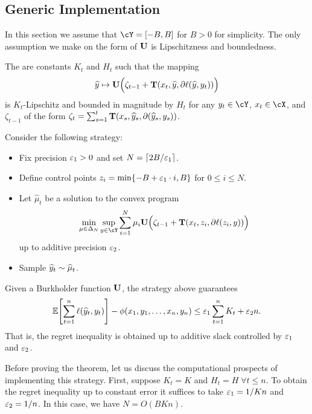 
\subsection{Generic Implementation}
In this section we assume that $\cY=\brk*{-B, B}$ for $B>0$ for simplicity. The only assumption we make on the form of $\burk$ is Lipschitzness and boundedness.

\begin{assumption}
The are constants $K_t$ and $H_t$ such that the mapping
\[
\yh\mapsto{}\burk\Big(\zeta_{t-1} + \suff(x_t,\pred,\partial \loss(\pred,y_t))\Big)
\]
is $K_t$-Lipschitz and bounded in magnitude by $H_t$ for any $y_t\in\cY$, $x_t\in\cX$, and $\zeta_{t-1}$ of the form $\zeta_{t}=\sum_{s=1}^{t}\suff(x_s, \pred_s, \partial(\pred_s, y_s))$.
\end{assumption}

Consider the following strategy:
\begin{itemize}
\item Fix precision $\veps_{1}>0$ and set $N=\ceil*{2B/\veps_{1}}$.
\item Define control points $z_{i} = \min\crl*{-B + \veps_{1}\cdot{}i, B}$ for $0\leq{}i\leq{}N$.
\item Let $\widehat{\mu}_{t}$ be a solution to the convex program
\begin{equation}
\label{eq:burkholder_approx}
\min_{\mu\in\Delta_{N}}\sup_{y\in\cY}\sum_{i=1}^{N}\mu_{i}\burk\Big(\zeta_{t-1} + \suff(x_t,z_{i},\partial \loss(z_{i},y))\Big)
\end{equation}
up to additive precision $\veps_{2}$.
\item Sample $\pred_{t}\sim{}\wh{\mu}_{t}$.
\end{itemize}

\begin{proposition}
\label{prop:burkholder_efficient}
Given a Burkholder function $\burk$, the strategy above guarantees
\[
\En\brk*{\sum_{t=1}^n \loss(\pred_t,y_t)} - \phi(x_1,y_1,\ldots,x_n,y_n) \leq{} \veps_{1}\sum_{t=1}^{n}K_t + \veps_{2}n.
\]
That is, the regret inequality  is obtained up to additive slack controlled by $\veps_{1}$ and $\veps_{2}$.
\end{proposition}
Before proving the theorem, let us discuss the computational prospects of implementing this strategy. First, suppose $K_t=K$ and $H_{t}=H\;\forall{}t\leq{}n$. To obtain the regret inequality up to constant error it suffices to take $\veps_{1}=1/Kn$ and $\veps_{2}=1/n$. In this case, we have $N=O(BKn)$. 

